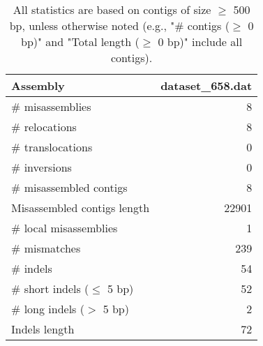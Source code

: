\documentclass[12pt,a4paper]{article}
\begin{document}
\begin{table}[ht]
\begin{center}
\caption{All statistics are based on contigs of size $\geq$ 500 bp, unless otherwise noted (e.g., "\# contigs ($\geq$ 0 bp)" and "Total length ($\geq$ 0 bp)" include all contigs).}
\begin{tabular}{|l*{1}{|r}|}
\hline
Assembly & dataset\_658.dat \\ \hline
\# misassemblies & 8 \\ \hline
\hspace{5mm}\# relocations & 8 \\ \hline
\hspace{5mm}\# translocations & 0 \\ \hline
\hspace{5mm}\# inversions & 0 \\ \hline
\# misassembled contigs & 8 \\ \hline
Misassembled contigs length & 22901 \\ \hline
\# local misassemblies & 1 \\ \hline
\# mismatches & 239 \\ \hline
\# indels & 54 \\ \hline
\hspace{5mm}\# short indels ($\leq$ 5 bp) & 52 \\ \hline
\hspace{5mm}\# long indels ($>$ 5 bp) & 2 \\ \hline
Indels length & 72 \\ \hline
\end{tabular}
\end{center}
\end{table}
\end{document}
